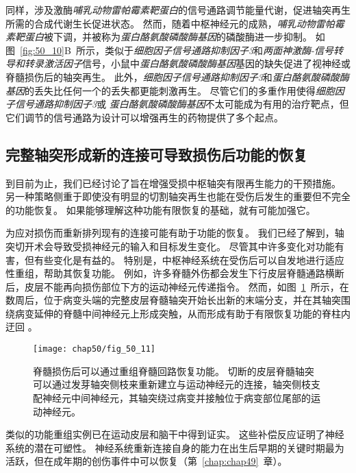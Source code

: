 同样，涉及激酶\textit{哺乳动物雷帕霉素靶蛋白}的信号通路调节能量代谢，促进轴突再生所需的合成代谢生长促进状态。
然而，随着中枢神经元的成熟，\textit{哺乳动物雷帕霉素靶蛋白}被下调，并被称为\textit{蛋白酪氨酸磷酸酶基因}的磷酸酶进一步抑制。
如图~\ref{fig:50_10}B~所示，类似于\textit{细胞因子信号通路抑制因子3}和\textit{两面神激酶-信号转导和转录激活因子}信号，小鼠中\textit{蛋白酪氨酸磷酸酶基因}基因的缺失促进了视神经或脊髓损伤后的轴突再生。
此外，\textit{细胞因子信号通路抑制因子3}和\textit{蛋白酪氨酸磷酸酶基因}的丢失比任何一个的丢失都更能刺激再生。
尽管它们的多重作用使得\textit{细胞因子信号通路抑制因子3}或 \textit{蛋白酪氨酸磷酸酶基因}不太可能成为有用的治疗靶点，但它们调节的信号通路为设计可以增强再生的药物提供了多个起点。



\subsection{完整轴突形成新的连接可导致损伤后功能的恢复}

到目前为止，我们已经讨论了旨在增强受损中枢轴突有限再生能力的干预措施。
另一种策略侧重于即使没有明显的切割轴突再生也能在受伤后发生的重要但不完全的功能恢复。
如果能够理解这种功能有限恢复的基础，就有可能加强它。


为应对损伤而重新排列现有的连接可能有助于功能的恢复。
我们已经了解到，轴突切开术会导致受损神经元的输入和目标发生变化。
尽管其中许多变化对功能有害，但有些变化是有益的。
特别是，中枢神经系统在受伤后可以自发地进行适应性重组，帮助其恢复功能。
例如，许多脊髓外伤都会发生下行皮层脊髓通路横断后，皮层不能再向损伤部位下方的运动神经元传递指令。
然而，如图~\ref{fig:50_11}~所示，在数周后，位于病变头端的完整皮层脊髓轴突开始长出新的末端分支，并在其轴突围绕病变延伸的脊髓中间神经元上形成突触，从而形成有助于有限恢复功能的脊柱内迂回 。



\begin{figure}[htbp]
	\centering
	\texttt{[image: chap50/fig\_50\_11]}
	\caption{脊髓损伤后可以通过重组脊髓回路恢复功能。
		切断的皮层脊髓轴突可以通过发芽轴突侧枝来重新建立与运动神经元的连接，轴突侧枝支配神经元中间神经元，其轴突绕过病变并接触位于病变部位尾部的运动神经元\cite{bareyre2004injured}。}
	\label{fig:50_11}
\end{figure}


类似的功能重组实例已在运动皮层和脑干中得到证实。
这些补偿反应证明了神经系统的潜在可塑性。
神经系统重新连接自身的能力在出生后早期的关键时期最为活跃，但在成年期的创伤事件中可以恢复（第~\ref{chap:chap49}~章）。


